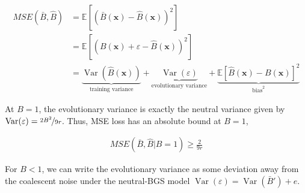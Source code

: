 \documentclass[11pt]{article}
\newcommand{\E}{\mathbb{E}}
\DeclareMathOperator{\var}{Var}
\begin{document}
\begin{align}
  MSE(\bar{B}, \hat{B}) &= \E[(\bar{B}(\mathbf{x}) - \hat{B}(\mathbf{x}))^2] \\
                        &= \E[(B(\mathbf{x}) + \varepsilon - \hat{B}(\mathbf{x}))^2] \\
                        &= \underbrace{\var(\hat{B}(\mathbf{x}))}_\text{training variance} + 
                      \underbrace{\var(\varepsilon)}_\text{evolutionary variance} + \underbrace{\E[\hat{B}(\mathbf{x}) - B(\mathbf{x})]^2}_{\mathrm{bias}^2}
\end{align}

At $B=1$, the evolutionary variance is exactly the neutral variance given by
$\var(\varepsilon) = \nicefrac{2B^2}{9r}$. Thus, MSE loss has an absolute bound at
$B=1$,

\begin{align}
  MSE(\bar{B}, \hat{B} | B = 1) \ge \frac{2}{9r}
\end{align}

For $B < 1$, we can write the evolutionary variance as some deviation
away from the coalescent noise under the neutral-BGS model $\var(\varepsilon) =
\var(\bar{B}') + e$.




\printbibliography
\end{document}
